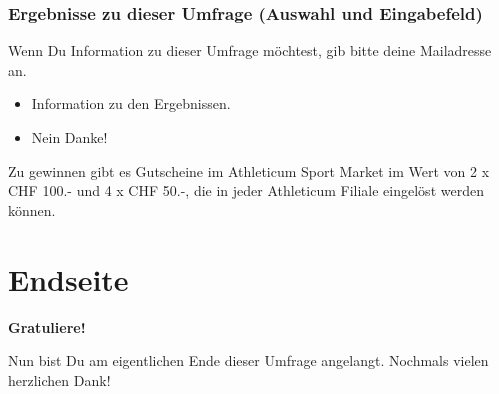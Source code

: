 \subsubsection*{Ergebnisse zu dieser Umfrage (Auswahl und Eingabefeld)}
Wenn Du Information zu dieser Umfrage möchtest, gib bitte deine Mailadresse an.
    \begin{itemize}
      \item Information zu den Ergebnissen.
      \item Nein Danke!      
    \end{itemize}
Zu gewinnen gibt es Gutscheine im Athleticum Sport Market im Wert von 2 x CHF 100.- und 4 x CHF 50.-, die in jeder Athleticum Filiale eingelöst werden können.
\section{Endseite}\label{anhangSection.endseite}
\textbf{Gratuliere!}\par
Nun bist Du am eigentlichen Ende dieser Umfrage angelangt. Nochmals vielen herzlichen Dank!
   
    